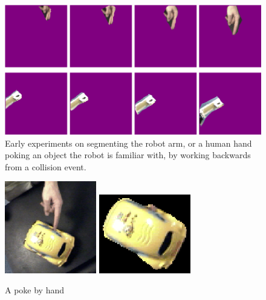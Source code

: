 \begin{figure}[tbh]
  \centerline{\includegraphics[width=12cm]{fig-poke-manipulator}}
  \caption{Early experiments on segmenting the robot arm, or a 
human hand poking an object the robot is familiar with, by working
backwards from a collision event.}
  \label{fig:manipulator}
\end{figure}

\begin{figure}[tbh]
  \centerline{
\includegraphics[width=4cm]{fig-car-hand-seg-src}
\hspace{1cm}
\includegraphics[width=4cm]{fig-car-hand-seg}
}
  \caption{A poke by hand}
  \label{fig:handpoke}
\end{figure}

